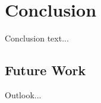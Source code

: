 \chapter{Conclusion} \label{chap:conclusion}
Conclusion text...

\section{Future Work} \label{sec:future_work}
Outlook...